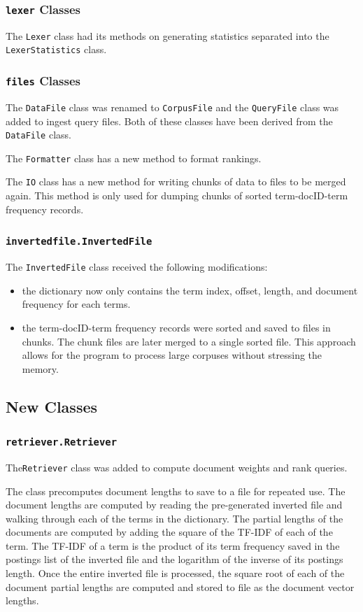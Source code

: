 \documentclass[11pt]{article}
\begin{document}
\subsubsection{\texttt{lexer} Classes}
The \texttt{Lexer} class had its methods on generating statistics separated into the \texttt{LexerStatistics} class.

\subsubsection{\texttt{files} Classes}
The \texttt{DataFile} class was renamed to \texttt{CorpusFile} and the \texttt{QueryFile} class was added to ingest query files. Both of these classes have been derived from the \texttt{DataFile} class.

The \texttt{Formatter} class has a new method to format rankings.

The \texttt{IO} class has a new method for writing chunks of data to files to be merged again. This method is only used for dumping chunks of sorted term-docID-term frequency records.

\subsubsection{\texttt{invertedfile.InvertedFile}}
The \texttt{InvertedFile} class received the following modifications:
\begin{itemize}
    \item the dictionary now only contains the term index, offset, length, and document frequency for each terms.
    \item the term-docID-term frequency records were sorted and saved to files in chunks. The chunk files are later merged to a single sorted file. This approach allows for the program to process  large corpuses without stressing the memory.
\end{itemize}

\subsection{New Classes}

\subsubsection{\texttt{retriever.Retriever}}
The\texttt{Retriever} class was added to compute document weights and rank queries.

The class precomputes document lengths to save to a file for repeated use. The document lengths are computed by reading the pre-generated inverted file and walking through each of the terms in the dictionary. The partial lengths of the documents are computed by adding the square of the TF-IDF of each of the term. The TF-IDF of a term is the product of its term frequency saved in the postings list of the inverted file and the logarithm of the inverse of its postings length. Once the entire inverted file is processed, the square root of each of the document partial lengths are computed and stored to file as the document vector lengths.
\end{document}
